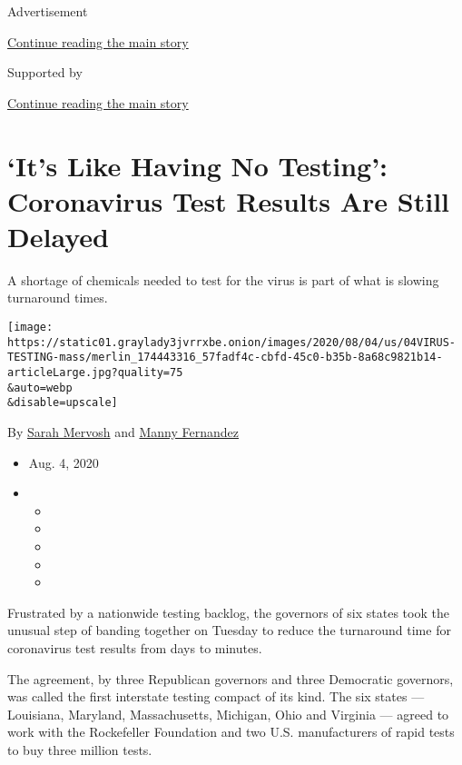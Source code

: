 Advertisement

\protect\hyperlink{after-top}{Continue reading the main story}

Supported by

\protect\hyperlink{after-sponsor}{Continue reading the main story}

\hypertarget{its-like-having-no-testing-coronavirus-test-results-are-still-delayed}{%
\section{`It's Like Having No Testing': Coronavirus Test Results Are
Still
Delayed}\label{its-like-having-no-testing-coronavirus-test-results-are-still-delayed}}

A shortage of chemicals needed to test for the virus is part of what is
slowing turnaround times.

\texttt{[image: https://static01.graylady3jvrrxbe.onion/images/2020/08/04/us/04VIRUS-TESTING-mass/merlin\_174443316\_57fadf4c-cbfd-45c0-b35b-8a68c9821b14-articleLarge.jpg?quality=75\\\&auto=webp\\\&disable=upscale]}

By \href{https://www.nytimes3xbfgragh.onion/by/sarah-mervosh}{Sarah
Mervosh} and
\href{https://www.nytimes3xbfgragh.onion/by/manny-fernandez}{Manny
Fernandez}

\begin{itemize}
\item
  Aug. 4, 2020
\item
  \begin{itemize}
  \item
  \item
  \item
  \item
  \item
  \end{itemize}
\end{itemize}

Frustrated by a nationwide testing backlog, the governors of six states
took the unusual step of banding together on Tuesday to reduce the
turnaround time for coronavirus test results from days to minutes.

The agreement, by three Republican governors and three Democratic
governors, was called the first interstate testing compact of its kind.
The six states --- Louisiana, Maryland, Massachusetts, Michigan, Ohio
and Virginia --- agreed to work with the Rockefeller Foundation and two
U.S. manufacturers of rapid tests to buy three million tests.

